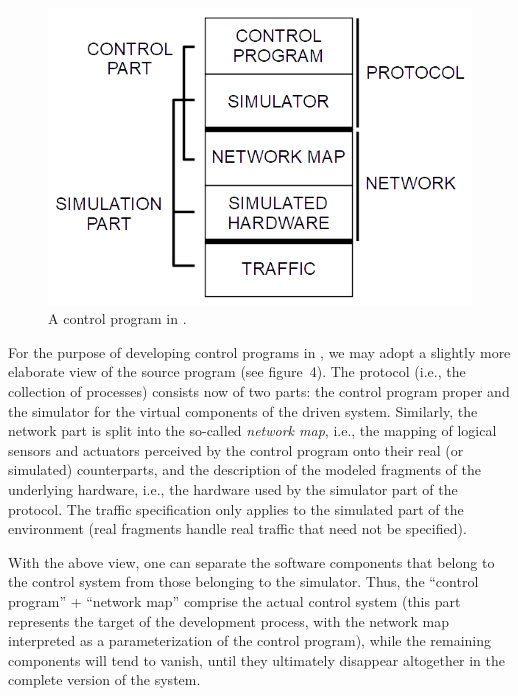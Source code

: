 \begin{figure}[htbp]%
\begin{center}
\includegraphics[scale=0.5]{FIGURES/struct3.png}
\caption{A control program in {\smurph}.}%
\end{center}
\end{figure}%

For the purpose of developing control programs in \smurph, we
may adopt a slightly
more elaborate view of the source program (see
figure~4).
The protocol (i.e., the collection of processes) consists now of two parts:
the control program proper and the simulator for the virtual components of
the driven system.
Similarly, the network part is split into the so-called {\em network map},
i.e., the mapping of logical sensors and actuators perceived by the
control program onto their real (or simulated) counterparts,
and the description of the modeled fragments of the underlying hardware, i.e.,
the hardware used by the simulator part of the protocol.
The traffic specification only applies to the simulated part of the environment
(real fragments handle real traffic that need not be specified).

With the above view, one can separate the software components that
belong to the control system from those belonging to the simulator.
Thus, the ``control program'' + ``network map'' comprise the actual
control system (this part represents the target of the development
process, with the network map interpreted as a parameterization of the
control program), while the remaining components will tend to vanish,
until they ultimately disappear altogether in the complete version of
the system.

